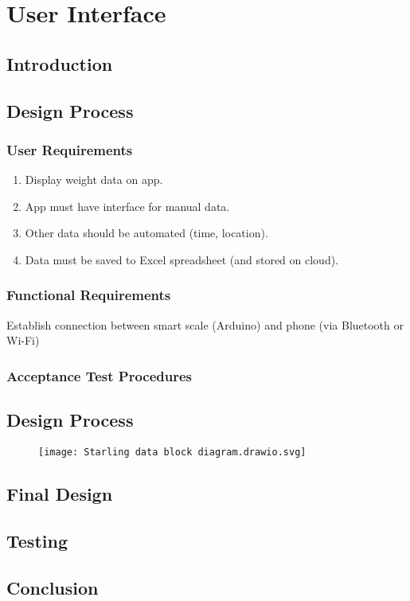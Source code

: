 \documentclass[class=report,11pt,crop=false]{standalone}
\begin{document}
	\chapter{User Interface \label{ch:user-interface}}
	
	\vspace{0.5cm}
	
	\section{Introduction}
	
	\section{Design Process}
		\subsection{User Requirements}
		\begin{enumerate}
			\item Display weight data on app.
			\item App must have interface for manual data.
			\item Other data should be automated (time, location).
			\item Data must be saved to Excel spreadsheet (and stored on cloud).
			
		\end{enumerate}
		
		\subsection{Functional Requirements}
			\item Establish connection between smart scale (Arduino) and phone (via Bluetooth or Wi-Fi)
			
		
		\subsection{Acceptance Test Procedures}
	
	\section{Design Process}
		
		\begin{figure}
			\texttt{[image: Starling data block diagram.drawio.svg]}
		\end{figure}
	
	\section{Final Design}
	
	\section{Testing}
	
	\section{Conclusion}
	
	\ifstandalone
	
	\printnoidxglossary[type=\acronymtype,nonumberlist]
	\fi
\end{document}
